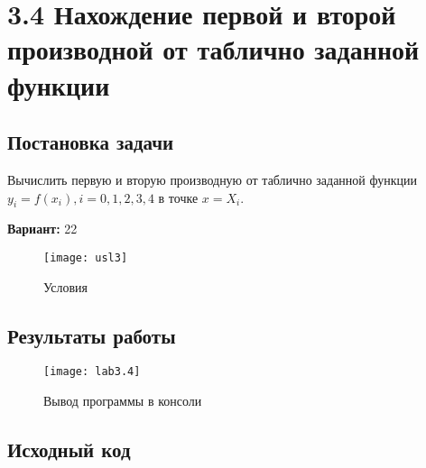 \section* {3.4  Нахождение первой и второй производной от таблично заданной функции}

\subsection{Постановка задачи}
Вычислить первую и вторую производную от таблично заданной функции $y_i=f(x_i), i=0,1,2,3,4$ в точке $x=X_i$.
 

{\bfseries Вариант:} 22

\begin{figure}[h!]
\centering
\texttt{[image: usl3]}
\caption{Условия}
\end{figure}

\subsection{Результаты работы}
\begin{figure}[h!]
\centering
\texttt{[image: lab3.4]}
\caption{Вывод программы в консоли}
\end{figure}


\pagebreak

\subsection{Исходный код}
% 


% 
% 
% 